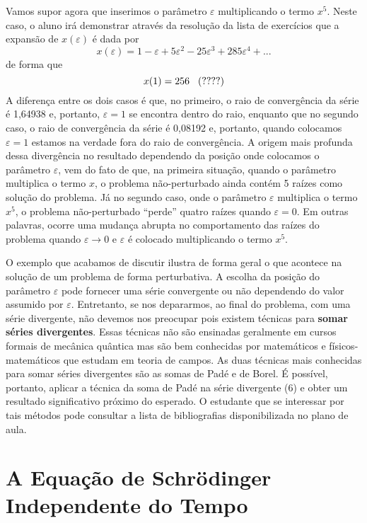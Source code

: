 \documentclass{article}
\begin{document}
Vamos supor agora que inserimos o parâmetro $\varepsilon$ multiplicando o termo $x^5$. Neste caso, o aluno irá demonstrar através da resolução da lista de exercícios que a expansão de $x(\varepsilon)$ é dada por
\begin{equation}
    x(\varepsilon) = 1 -\varepsilon + 5\varepsilon^2 - 25\varepsilon^3 + 285\varepsilon^4 + ...
\end{equation}
de forma que
\begin{equation}
    x(1) = 256 \hspace{0.3cm}\text{(????)}
\end{equation}
A diferença entre os dois casos é que, no primeiro, o raio de convergência da série é 1,64938 e, portanto, $\varepsilon = 1$ se encontra dentro do raio, enquanto que no segundo caso, o raio de convergência da série é 0,08192 e, portanto, quando colocamos $\varepsilon = 1$ estamos na verdade fora do raio de convergência. A origem mais profunda dessa divergência no resultado dependendo da posição onde colocamos o parâmetro $\varepsilon$, vem do fato de que, na primeira situação, quando o parâmetro multiplica o termo $x$, o problema não-perturbado ainda contém 5 raízes como solução do problema. Já no segundo caso, onde o parâmetro $\varepsilon$ multiplica o termo $x^5$, o problema não-perturbado ``perde'' quatro raízes quando $\varepsilon = 0$. Em outras palavras, ocorre uma mudança abrupta no comportamento das raízes do problema quando $\varepsilon\rightarrow 0$ e $\varepsilon$ é colocado multiplicando o termo $x^5$. 

O exemplo que acabamos de discutir ilustra de forma geral o que acontece na solução de um problema de forma perturbativa. A escolha da posição do parâmetro $\varepsilon$ pode fornecer uma série convergente ou não dependendo do valor assumido por $\varepsilon$. Entretanto, se nos depararmos, ao final do problema, com uma série divergente, não devemos nos preocupar pois existem técnicas para \textbf{somar séries divergentes}. Essas técnicas não são ensinadas geralmente em cursos formais de mecânica quântica mas são bem conhecidas por matemáticos e físicos-matemáticos que estudam em teoria de campos. As duas técnicas mais conhecidas para somar séries divergentes são as somas de Padé e de Borel. É possível, portanto, aplicar a técnica da soma de Padé na série divergente (6) e obter um resultado significativo próximo do esperado. O estudante que se interessar por tais métodos pode consultar a lista de bibliografias disponibilizada no plano de aula.


\section{A Equação de Schrödinger Independente do Tempo}
\end{document}
